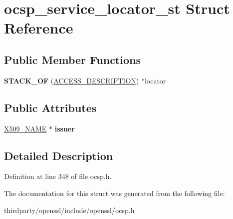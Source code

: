 \hypertarget{structocsp__service__locator__st}{}\section{ocsp\+\_\+service\+\_\+locator\+\_\+st Struct Reference}
\label{structocsp__service__locator__st}
\subsection*{Public Member Functions}
\begin{DoxyCompactItemize}
\item 
\mbox{\label{structocsp__service__locator__st_a77da4c654efc14b8d701175f67b4e766}} 
{\bfseries S\+T\+A\+C\+K\+\_\+\+OF} (\hyperlink{struct_a_c_c_e_s_s___d_e_s_c_r_i_p_t_i_o_n__st}{A\+C\+C\+E\+S\+S\+\_\+\+D\+E\+S\+C\+R\+I\+P\+T\+I\+ON}) $\ast$locator
\end{DoxyCompactItemize}
\subsection*{Public Attributes}
\begin{DoxyCompactItemize}
\item 
\mbox{\label{structocsp__service__locator__st_a223e62f217b2c10dd2502284591296ab}} 
\hyperlink{struct_x509__name__st}{X509\+\_\+\+N\+A\+ME} $\ast$ {\bfseries issuer}
\end{DoxyCompactItemize}


\subsection{Detailed Description}


Definition at line 348 of file ocsp.\+h.



The documentation for this struct was generated from the following file\+:\begin{DoxyCompactItemize}
\item 
thirdparty/openssl/include/openssl/ocsp.\+h\end{DoxyCompactItemize}
